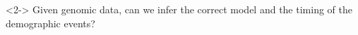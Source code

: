 \begin{frame}[t,label=fullmodel]

    \bigskip
    \begin{minipage}[t][0.45\textheight][t]{\linewidth}
            \begin{center}
                \begin{onlyenv}<2->
                Given genomic data, can we infer the correct model and the
                timing of the demographic events?
                \end{onlyenv}
            \end{center}

    \end{minipage}
\end{frame}
